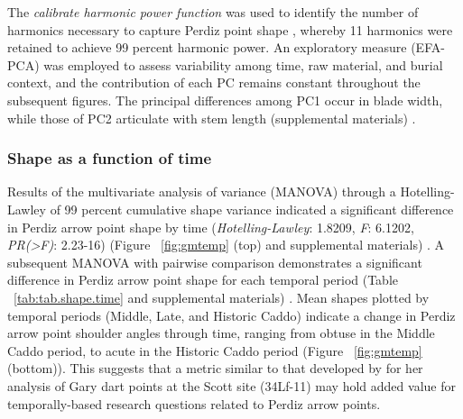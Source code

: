 \documentclass[review]{elsarticle}
\begin{document}
The \textit{calibrate harmonic power function} was used to identify the number of harmonics necessary to capture Perdiz point shape  \citep{RN8925}, whereby 11 harmonics were retained to achieve 99 percent harmonic power. An exploratory measure (EFA-PCA) was employed to assess variability among time, raw material, and burial context, and the contribution of each PC remains constant throughout the subsequent figures. The principal differences among PC1 occur in blade width, while those of PC2 articulate with stem length (supplemental materials) \citep[Chapter 4]{RN8980}.

\subsubsection*{Shape as a function of time}

Results of the multivariate analysis of variance (MANOVA) through a Hotelling-Lawley of 99 percent cumulative shape variance indicated a significant difference in Perdiz arrow point shape by time (\textit{Hotelling-Lawley}: 1.8209, \textit{F}: 6.1202, \textit{PR(>F)}: 2.23-16) (Figure ~\ref{fig:gmtemp} (top) and supplemental materials) \citep[Chapter 4]{RN8980}. A subsequent MANOVA with pairwise comparison demonstrates a significant difference in Perdiz arrow point shape for each temporal period (Table ~\ref{tab:tab.shape.time} and supplemental materials) \citep[Chapter 4]{RN8980}. Mean shapes plotted by temporal periods (Middle, Late, and Historic Caddo) indicate a change in Perdiz arrow point shoulder angles through time, ranging from obtuse in the Middle Caddo period, to acute in the Historic Caddo period (Figure ~\ref{fig:gmtemp} (bottom)). This suggests that a metric similar to that developed by \citet{RN8275} for her analysis of Gary dart points at the Scott site (34Lf-11) may hold added value for temporally-based research questions related to Perdiz arrow points.
\end{document}
